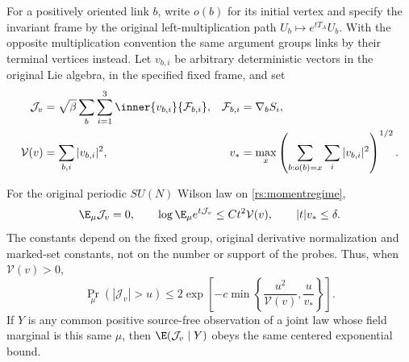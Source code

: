 For a positively oriented link \(b\), write \(o(b)\) for its initial vertex and specify the invariant frame by the original left-multiplication path \(U_b\mapsto e^{tT_A}U_b\). With the opposite multiplication convention the same argument groups links by their terminal vertices instead. Let \(v_{b,i}\) be arbitrary deterministic vectors in the original Lie algebra, in the specified fixed frame, and set
\begin{align}
 \mathcal J_v&=\sqrt\beta\sum_b\sum_{i=1}^3
                       \inner{v_{b,i}}{\mathcal F_{b,i}},
 &\mathcal F_{b,i}&=\nabla_bS_i,\notag\\
 \mathcal V(v)&=\sum_{b,i}|v_{b,i}|^2,
 &v_*&=\max_x\left(\sum_{b:o(b)=x}\sum_i|v_{b,i}|^2\right)^{1/2}.
 \label{dm:current}
\end{align}

\begin{theorem}
\label{dm:currenttheorem}
For the original periodic \(SU(N)\) Wilson law on \eqref{rs:momentregime},
\begin{equation}
 \E_\mu\mathcal J_v=0,\qquad
 \log\E_\mu e^{t\mathcal J_v}
 \le Ct^2\mathcal V(v),\qquad |t|v_*\le\delta.
 \label{dm:currentmgf}
\end{equation}
The constants depend on the fixed group, original derivative normalization and marked-set constants, not on the number or support of the probes. Thus, when \(\mathcal V(v)>0\),
\begin{equation}
 \Pr_\mu(|\mathcal J_v|>u)
 \le2\exp\left[-c\min\left\{
       \frac{u^2}{\mathcal V(v)},\frac{u}{v_*}\right\}\right].
 \label{dm:currenttail}
\end{equation}
If \(Y\) is any common positive source-free observation of a joint law whose field marginal is this same \(\mu\), then \(\E(\mathcal J_v\mid Y)\) obeys the same centered exponential bound.
\end{theorem}
